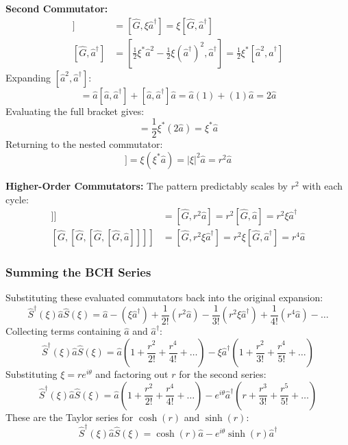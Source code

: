 \textbf{Second Commutator:}
\begin{align*}
[\hat{G}, [\hat{G}, \hat{a}]] &= [\hat{G}, \xi\hat{a}^\dagger] = \xi[\hat{G}, \hat{a}^\dagger] \\
[\hat{G}, \hat{a}^\dagger] &= \left[ \frac{1}{2}\xi^*\hat{a}^2 - \frac{1}{2}\xi(\hat{a}^\dagger)^2, \hat{a}^\dagger \right] = \frac{1}{2}\xi^*[\hat{a}^2, \hat{a}^\dagger]
\end{align*}
Expanding $[\hat{a}^2, \hat{a}^\dagger]$:
\begin{equation*}
[\hat{a}^2, \hat{a}^\dagger] = \hat{a}[\hat{a}, \hat{a}^\dagger] + [\hat{a}, \hat{a}^\dagger]\hat{a} = \hat{a}(1) + (1)\hat{a} = 2\hat{a}
\end{equation*}
Evaluating the full bracket gives:
\begin{equation*}
[\hat{G}, \hat{a}^\dagger] = \frac{1}{2}\xi^*(2\hat{a}) = \xi^*\hat{a}
\end{equation*}
Returning to the nested commutator:
\begin{equation*}
[\hat{G}, [\hat{G}, \hat{a}]] = \xi(\xi^*\hat{a}) = |\xi|^2\hat{a} = r^2\hat{a}
\end{equation*}

\textbf{Higher-Order Commutators:}
The pattern predictably scales by $r^2$ with each cycle:
\begin{align*}
[\hat{G}, [\hat{G}, [\hat{G}, \hat{a}]]] &= [\hat{G}, r^2\hat{a}] = r^2[\hat{G}, \hat{a}] = r^2\xi\hat{a}^\dagger \\
[\hat{G}, [\hat{G}, [\hat{G}, [\hat{G}, \hat{a}]]]] &= [\hat{G}, r^2\xi\hat{a}^\dagger] = r^2\xi[\hat{G}, \hat{a}^\dagger] = r^4\hat{a}
\end{align*}

\subsubsection{Summing the BCH Series}
Substituting these evaluated commutators back into the original expansion:
\begin{equation*}
\hat{S}^\dagger(\xi) \hat{a} \hat{S}(\xi) = \hat{a} - (\xi\hat{a}^\dagger) + \frac{1}{2!}(r^2\hat{a}) - \frac{1}{3!}(r^2\xi\hat{a}^\dagger) + \frac{1}{4!}(r^4\hat{a}) - \dots
\end{equation*}
Collecting terms containing $\hat{a}$ and $\hat{a}^\dagger$:
\begin{equation*}
\hat{S}^\dagger(\xi) \hat{a} \hat{S}(\xi) = \hat{a}\left(1 + \frac{r^2}{2!} + \frac{r^4}{4!} + \dots\right) - \xi\hat{a}^\dagger\left(1 + \frac{r^2}{3!} + \frac{r^4}{5!} + \dots\right)
\end{equation*}
Substituting $\xi = r e^{i\theta}$ and factoring out $r$ for the second series:
\begin{equation*}
\hat{S}^\dagger(\xi) \hat{a} \hat{S}(\xi) = \hat{a}\left(1 + \frac{r^2}{2!} + \frac{r^4}{4!} + \dots\right) - e^{i\theta}\hat{a}^\dagger\left(r + \frac{r^3}{3!} + \frac{r^5}{5!} + \dots\right)
\end{equation*}
These are the Taylor series for $\cosh(r)$ and $\sinh(r)$:
\begin{equation*}
\hat{S}^\dagger(\xi) \hat{a} \hat{S}(\xi) = \cosh(r)\hat{a} - e^{i\theta}\sinh(r)\hat{a}^\dagger
\end{equation*}

